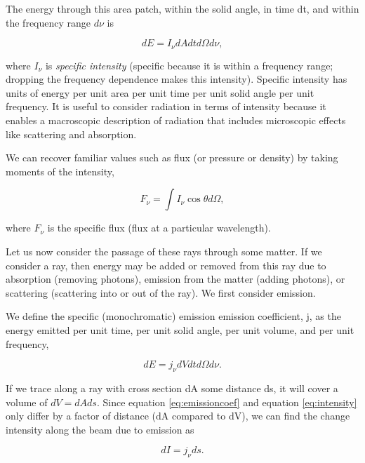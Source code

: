 The energy through this area patch, within the solid angle, in time dt, and within the frequency range $d\nu$ is

\begin{equation}
\label{eq:intensity}
dE = I_{\nu}dA dt d\Omega d\nu,
\end{equation}

where $I_{\nu}$ is \emph{specific intensity} (specific because it is within a frequency range; dropping the frequency dependence makes this intensity). Specific intensity has units of energy per unit area per unit time per unit solid angle per unit frequency. It is useful to consider radiation in terms of intensity because it enables a macroscopic description of radiation that includes microscopic effects like scattering and absorption.

We can recover familiar values such as flux (or pressure or density) by taking moments of the intensity,

\begin{equation}
\label{eq:flux}
F_{\nu} = \int I_{\nu}\cos{\theta}d\Omega,
\end{equation}

where $F_{\nu}$ is the specific flux (flux at a particular wavelength).

Let us now consider the passage of these rays through some matter. If we consider a ray, then energy may be added or removed from this ray due to absorption (removing photons), emission from the matter (adding photons), or scattering (scattering into or out of the ray). We first consider emission.

We define the specific (monochromatic) emission emission coefficient, j, as the energy emitted per unit time, per unit solid angle, per unit volume, and per unit frequency,

\begin{equation}
\label{eq:emissioncoef}
dE = j_{\nu} dV dt d\Omega d\nu.
\end{equation}

If we trace along a ray with cross section dA some distance ds, it will cover a volume of $dV = dA ds$. Since equation \ref{eq:emissioncoef} and equation \ref{eq:intensity} only differ by a factor of distance (dA compared to dV), we can find the change intensity along the beam due to emission as

\begin{equation}
\label{eq:emissionintensity}
dI = j_{\nu} ds.
\end{equation}

